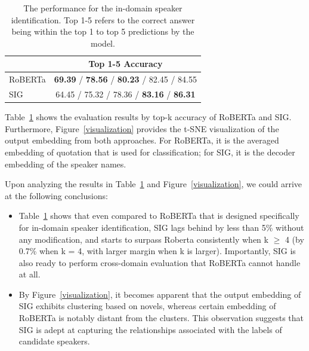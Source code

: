\documentclass[letterpaper]{article} %
\begin{document}
\begin{table}[htbp!]
    \centering
    \begin{tabular}{l |c}

       \toprule
        & \textbf{Top 1-5 Accuracy}  \\
       \midrule  
       RoBERTa  & \textbf{69.39} / \textbf{78.56} / \textbf{80.23} / 82.45 / 84.55 \\
       SIG & 64.45 / 75.32 / 78.36 / \textbf{83.16} / \textbf{86.31} \\
       \bottomrule
    \end{tabular}
    \caption{The performance for the in-domain speaker identification. Top 1-5 refers to the correct answer being within the top 1 to top 5 predictions by the model.}
    \label{tab:id}
\end{table}

Table~\ref{tab:id} shows the evaluation results by top-k accuracy of RoBERTa and SIG. Furthermore, Figure~\ref{visualization} provides the t-SNE visualization of the output embedding from both approaches. For RoBERTa, it is the averaged embedding of quotation that is used for classification; for SIG, it is the decoder embedding of the speaker names.

Upon analyzing the results in Table~\ref{tab:id} and Figure~\ref{visualization}, we could arrive at the following conclusions:
\begin{itemize}
    \item Table~\ref{tab:id} shows that even compared to RoBERTa that is designed specifically for in-domain speaker identification, SIG lags behind by less than 5\% without any modification, and starts to surpass Roberta consistently when k $\geq $ 4 (by 0.7\% when k = 4, with larger margin when k is larger). Importantly, SIG is also ready to perform cross-domain evaluation that RoBERTa cannot handle at all.
    \item By Figure~\ref{visualization}, it becomes apparent that the output embedding of SIG exhibits clustering based on novels, whereas certain embedding of RoBERTa is notably distant from the clusters. This observation suggests that SIG is adept at capturing the relationships associated with the labels of candidate speakers.
\end{itemize}
\end{document}
